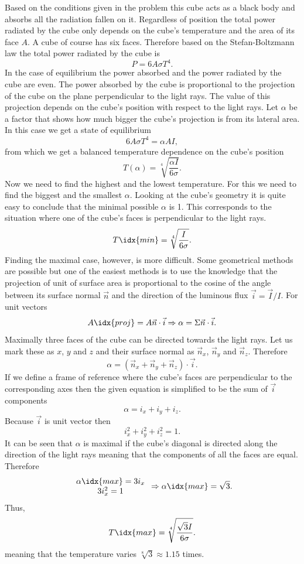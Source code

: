 \documentclass[11pt]{article}
\begin{document}
\solueng
Based on the conditions given in the problem this cube acts as a black body and absorbs all the radiation fallen on it. Regardless of position the total power radiated by the cube only depends on the cube’s temperature and the area of its face $A$. A cube of course has six faces. Therefore based on the Stefan-Boltzmann law the total power radiated by the cube is
$$
P=6A\sigma T^4 .
$$
In the case of equilibrium the power absorbed and the power radiated by the cube are even. The power absorbed by the cube is proportional to the projection of the cube on the plane perpendicular to the light rays. The value of this projection depends on the cube’s position with respect to the light rays. Let $\alpha$ be a factor that shows how much bigger the cube’s projection is from its lateral area. In this case we get a state of equilibrium 
$$
6A\sigma T^4=\alpha AI,
$$
from which we get a balanced temperature dependence on the cube’s position
$$
T(\alpha)=\sqrt[4]{\frac{\alpha I}{6\sigma}}.
$$
Now we need to find the highest and the lowest temperature. For this we need to find the biggest and the smallest $\alpha$. Looking at the cube’s geometry it is quite easy to conclude that the minimal possible $\alpha$ is 1. This corresponds to the situation where one of the cube’s faces is perpendicular to the light rays. 
$$
T\idx{min}=\sqrt[4]{\frac{ I}{6\sigma}}.
$$
Finding the maximal case, however, is more difficult. Some geometrical methods are possible but one of the easiest methods is to use the knowledge that the projection of unit of surface area is proportional to the cosine of the angle between its surface normal $\vec{n}$ and the direction of the luminous flux $\vec{i}=\vec{I}/I$. For unit vectors
$$
A\idx{proj}=A\vec{n}\cdot\vec{i} \Rightarrow \alpha=\Sigma\vec{n}\cdot\vec{i}.
$$
Maximally three faces of the cube can be directed towards the light rays. Let us mark these as $x$, $y$ and $z$ and their surface normal as $\vec{n}_x$, $\vec{n}_y$ and $\vec{n}_z$. Therefore
$$
\alpha= (\vec{n}_x + \vec{n}_y + \vec{n}_z) \cdot \vec{i}.
$$
If we define a frame of reference where the cube’s faces are perpendicular to the corresponding axes then the given equation is simplified to be the sum of $\vec{i}$ components
$$
\alpha = i_x + i_y + i_z.
$$
Because $\vec{i}$ is unit vector then
$$
i_x^2+i_y^2+i_z^2=1.
$$
It can be seen that $\alpha$ is maximal if the cube’s diagonal is directed along the direction of the light rays meaning that the components of all the faces are equal. Therefore
$$
\begin{array}{c} 
\alpha\idx{max} = 3i_x  \\ 3i_x^2=1  
\end{array}
\Rightarrow \alpha\idx{max}=\sqrt{3}.
$$
Thus,
$$
T\idx{max}=\sqrt[4]{\frac{\sqrt{3} I}{6\sigma}}.
$$
meaning that the temperature varies $\sqrt[8]{3} \approx 1.15$ times.
\probend
\bigskip
\end{document}
